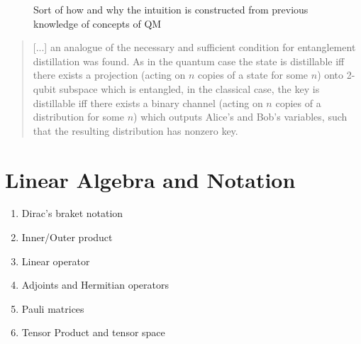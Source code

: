 	\begin{figure}[H]
		\centering
		
		\caption{Sort of how and why the intuition is constructed from previous knowledge of concepts of QM}
	\end{figure}
	
	\begin{quotation}
	[...] an analogue of the necessary and sufficient condition for entanglement distillation was found.
	As in the quantum case the state is distillable iff there exists a projection (acting on $n$ copies of a state for some $n$) onto 2-qubit subspace which is entangled, 
	in the classical case, the key is distillable iff there exists a binary channel (acting on $n$ copies of a distribution for some $n$) which outputs Alice's and Bob's variables, such that the resulting distribution has nonzero key.
	\cite{4H07}
	\end{quotation}
	
	
	\section{Linear Algebra and Notation}
	
	\begin{enumerate}
	\item Dirac's braket notation
	\item Inner/Outer product
	\item Linear operator
	\item Adjoints and Hermitian operators
	\item Pauli matrices
	\item Tensor Product and tensor space
	\end{enumerate}
	
